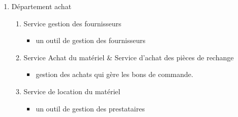 \documentclass [a4paper] {report}
\begin{document}
\begin{enumerate}
\item Département achat
	\begin {enumerate}
	\item Service gestion des fournisseurs
		\begin{itemize}
		\item un outil de gestion des fournisseurs
		\end{itemize}
	\item Service Achat du matériel & Service d'achat des pièces de rechange
		\begin{itemize}
		\item gestion des achats qui gère les bons de commande.
		\end{itemize}
	\item Service de location du matériel
		\begin{itemize}
		\item un outil de gestion des prestataires
		\end{itemize}
	\end{enumerate}
\end{enumerate}
\end{document}
